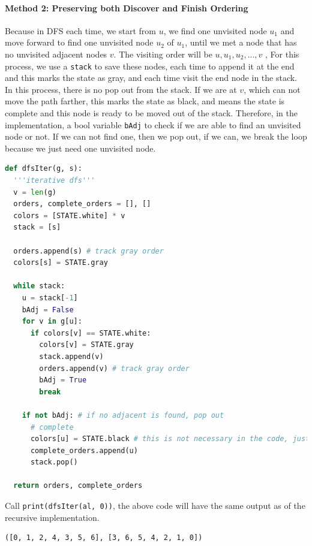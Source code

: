 \documentclass[main.tex]{subfiles}
\begin{document}
\paragraph{Method 2: Preserving both Discover and Finish Ordering}
 Because in DFS each time, we start from $u$, we find one unvisited node  $u_1$ and move forward to find one unvisited node $u_2$ of $u_1$, until we met a node that has no unvisited adjacent nodes $v$. The visiting order will be $u, u_1, u_2,..., v$ , For this process, we use a \texttt{stack} to save these nodes, each time to append it at the end and this marks the state as gray, and each time visit the end node in the stack. In this process, there is no pop out from the stack. If we are at $v$, which can not move the path farther, this marks the state as black, and means the state is complete and this node is ready to be moved out of the stack.  Therefore, in the implementation,  a bool variable \texttt{bAdj} to check if we are able to find an unvisited node or not. If we can not find one, then we pop out, if we can, we break the loop because we just need one unvisited node.
\begin{lstlisting}[language = Python]
def dfsIter(g, s):
  '''iterative dfs'''
  v = len(g)
  orders, complete_orders = [], []
  colors = [STATE.white] * v
  stack = [s]

  orders.append(s) # track gray order
  colors[s] = STATE.gray
        
  while stack:
    u = stack[-1]
    bAdj = False
    for v in g[u]:
      if colors[v] == STATE.white:
        colors[v] = STATE.gray
        stack.append(v)
        orders.append(v) # track gray order
        bAdj = True
        break
     
    if not bAdj: # if no adjacent is found, pop out
      # complete
      colors[u] = STATE.black # this is not necessary in the code, just to help track the state
      complete_orders.append(u)
      stack.pop()
    
  return orders, complete_orders
\end{lstlisting}
Call \texttt{print(dfsIter(al, 0))}, the above code will have the same output as of the recursive implementation. 
\begin{lstlisting}[numbers=none]
([0, 1, 2, 4, 3, 5, 6], [3, 6, 5, 4, 2, 1, 0])
\end{lstlisting}
\end{document}
